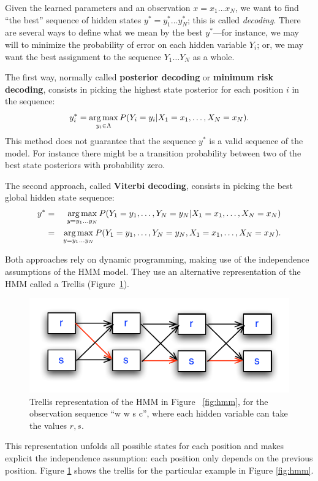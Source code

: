 Given the learned parameters and an
observation $x = x_1\ldots x_N$, we want to find ``the best'' sequence of hidden states 
$y^* = y_1^* \ldots y_N^*$;
 this is called \emph{decoding}. There are several ways to define what we mean by the best
$y^*$---for instance, we may will to minimize the probability of error
on each hidden
variable $Y_i$; or, we may want the best assignment
to the sequence $Y_1\ldots Y_N$ as a whole.

The first way, normally called \textbf{posterior decoding} or \textbf{minimum risk decoding}, consists
in picking the highest state posterior for each position $i$ in the sequence:
\begin{equation}
y_i^* = \operatorname*{arg\,max}_{y_i \in \Lambda} P(Y_i=y_i | X_1=x_1,\ldots,X_N =x_N).
\end{equation}
This method does not guarantee that the sequence $y^*$ is a
valid sequence of the model. For instance there might be a transition
probability between two of the best state posteriors with probability
zero. 

The second approach, called \textbf{Viterbi decoding}, consists in
picking the best global hidden state sequence: 
\begin{eqnarray}
y^* &=& \operatorname*{arg\,max}_{y = y_1\ldots y_N} P(Y_1=y_1,\ldots, Y_N=y_N | X_1=x_1,\ldots,X_N =x_N)\nonumber\\
&=& \operatorname*{arg\,max}_{y = y_1\ldots y_N} P(Y_1=y_1,\ldots, Y_N=y_N, X_1=x_1,\ldots,X_N =x_N).
\end{eqnarray}

Both approaches rely on dynamic programming, making use of the
independence assumptions of the HMM model. They use an alternative
representation of the HMM called a Trellis (Figure~\ref{fig:trellis}). 
\begin{figure}
\centering
\includegraphics[scale=1]{figs/sequences/trellis}
\caption[HMM Trellis representation.]{\label{fig:trellis} Trellis
  representation of the HMM in Figure ~\ref{fig:hmm}, for the observation
  sequence ``w w s c'', where each hidden variable can take the values $r,s$.}
\end{figure}
This representation unfolds all possible states for each position and
makes explicit the independence assumption: each position only
depends on the previous position. Figure \ref{fig:trellis} shows the
trellis for the particular example in Figure \ref{fig:hmm}. 


